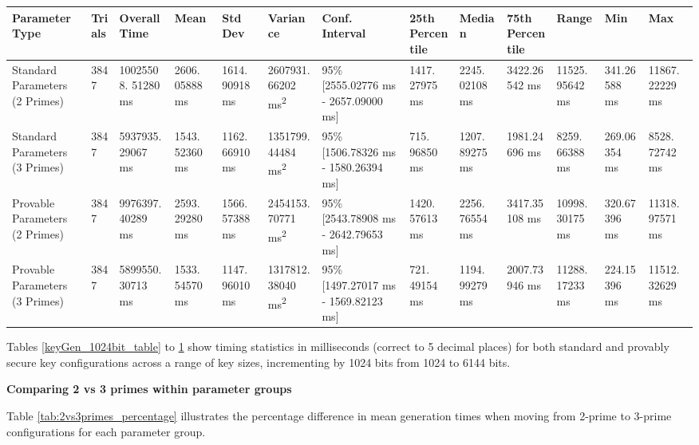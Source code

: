 \documentclass[]{final_report}
\theoremstyle{definition}
\begin{document}
\begin{landscape}
\begin{table}[H]
\begin{tabular}{|p{2.5cm}|p{1cm}|p{1.5cm}|p{1.6cm}|p{1.3cm}|p{1.5cm}|p{2.5cm}|p{1.5cm}|p{1.38cm}|p{1.7cm}|p{1.5cm}|p{1.5cm}|p{1.7cm}|}
\hline
\textbf{Parameter Type} & \textbf{Trials} & \textbf{Overall Time} & \textbf{Mean} & \textbf{Std Dev} & \textbf{Variance} & \textbf{Conf. Interval} & \textbf{25th Percentile} & \textbf{Median} & \textbf{75th Percentile} & \textbf{Range} & \textbf{Min} & \textbf{Max} \\
\hline
Standard Parameters (2 Primes) & 3847 & 10025508.
51280 ms & 2606.
05888 ms & 1614.
90918 ms & 2607931.
66202 ms\textsuperscript{2} & 95\% [2555.02776 ms - 2657.09000 ms] & 1417.
27975 ms & 2245.
02108 ms & 3422.26542 ms & 11525.
95642 ms & 341.26588 ms & 11867.
22229 ms \\
\hline
Standard Parameters (3 Primes) & 3847 & 5937935.
29067 ms & 1543.
52360 ms & 1162.
66910 ms & 1351799.
44484 ms\textsuperscript{2} & 95\% [1506.78326 ms - 1580.26394 ms] & 715.
96850 ms & 1207.
89275 ms & 1981.24696 ms & 8259.
66388 ms & 269.06354 ms & 8528.
72742 ms \\
\hline
Provable Parameters (2 Primes) & 3847 & 9976397.
40289 ms & 2593.
29280 ms & 1566.
57388 ms & 2454153.
70771 ms\textsuperscript{2} & 95\% [2543.78908 ms - 2642.79653 ms] & 1420.
57613 ms & 2256.
76554 ms & 3417.35108 ms & 10998.
30175 ms & 320.67396 ms & 11318.
97571 ms \\
\hline
Provable Parameters (3 Primes) & 3847 & 5899550.
30713 ms & 1533.
54570 ms & 1147.
96010 ms & 1317812.
38040 ms\textsuperscript{2} & 95\% [1497.27017 ms - 1569.82123 ms] & 721.
49154 ms & 1194.
99279 ms & 2007.73946 ms & 11288.
17233 ms & 224.15396 ms & 11512.
32629 ms \\
\hline
\end{tabular}
\label{keyGen_6144bit_table}
\end{table}


\end{landscape}


  
Tables \ref{keyGen_1024bit_table} to \ref{keyGen_6144bit_table} show timing statistics in milliseconds (correct to 5 decimal places) for both standard and provably secure key configurations across a range of key sizes, incrementing by 1024 bits from 1024 to 6144 bits. 


\textbf{Comparing 2 vs 3 primes within parameter groups}


Table \ref{tab:2vs3primes_percentage} illustrates the percentage difference in mean generation times when moving from 2-prime to 3-prime configurations for each parameter group. 
\end{document}
